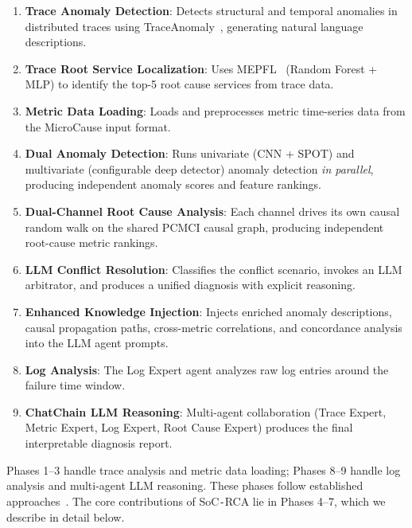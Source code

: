 \documentclass[a4paper,fleqn]{cas-dc}
\newcommand{\sysname}{SoC\texttt{-}RCA}
\begin{document}
\begin{enumerate}[leftmargin=*]
  \item \textbf{Trace Anomaly Detection}: Detects structural and temporal anomalies in distributed traces using TraceAnomaly~\cite{9251058}, generating natural language descriptions.
  \item \textbf{Trace Root Service Localization}: Uses MEPFL~\cite{10.1145/3338906.3338961} (Random Forest + MLP) to identify the top-5 root cause services from trace data.
  \item \textbf{Metric Data Loading}: Loads and preprocesses metric time-series data from the MicroCause input format.
  \item \textbf{Dual Anomaly Detection}: Runs univariate (CNN + SPOT) and multivariate (configurable deep detector) anomaly detection \emph{in parallel}, producing independent anomaly scores and feature rankings.
  \item \textbf{Dual-Channel Root Cause Analysis}: Each channel drives its own causal random walk on the shared PCMCI causal graph, producing independent root-cause metric rankings.
  \item \textbf{LLM Conflict Resolution}: Classifies the conflict scenario, invokes an LLM arbitrator, and produces a unified diagnosis with explicit reasoning.
  \item \textbf{Enhanced Knowledge Injection}: Injects enriched anomaly descriptions, causal propagation paths, cross-metric correlations, and concordance analysis into the LLM agent prompts.
  \item \textbf{Log Analysis}: The Log Expert agent analyzes raw log entries around the failure time window.
  \item \textbf{ChatChain LLM Reasoning}: Multi-agent collaboration (Trace Expert, Metric Expert, Log Expert, Root Cause Expert) produces the final interpretable diagnosis report.
\end{enumerate}

Phases 1--3 handle trace analysis and metric data loading; Phases 8--9 handle log analysis and multi-agent LLM reasoning.  These phases follow established approaches~\cite{9251058,10.1145/3338906.3338961,11449471}.  The core contributions of \sysname{} lie in Phases 4--7, which we describe in detail below.
\end{document}
